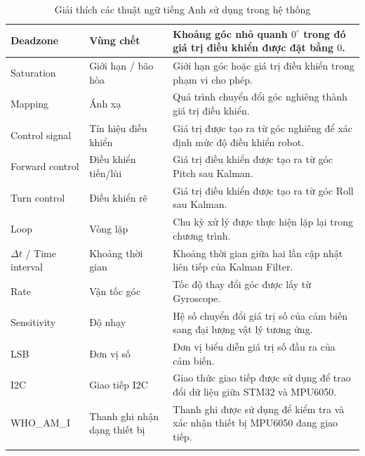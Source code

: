 \documentclass[a4paper,12pt]{report}
\begin{document}
\begin{longtable}{|p{3.5cm}|p{3.5cm}|p{7cm}|}
    Deadzone &
    Vùng chết &
    Khoảng góc nhỏ quanh $0^\circ$ trong đó giá trị điều khiển được đặt bằng $0$. \\
    \hline

    Saturation &
    Giới hạn / bão hòa &
    Giới hạn góc hoặc giá trị điều khiển trong phạm vi cho phép. \\
    \hline

    Mapping &
    Ánh xạ &
    Quá trình chuyển đổi góc nghiêng thành giá trị điều khiển. \\
    \hline

    Control signal &
    Tín hiệu điều khiển &
    Giá trị được tạo ra từ góc nghiêng để xác định mức độ điều khiển robot. \\
    \hline

    Forward control &
    Điều khiển tiến/lùi &
    Giá trị điều khiển được tạo ra từ góc Pitch sau Kalman. \\
    \hline

    Turn control &
    Điều khiển rẽ &
    Giá trị điều khiển được tạo ra từ góc Roll sau Kalman. \\
    \hline

    Loop &
    Vòng lặp &
    Chu kỳ xử lý được thực hiện lặp lại trong chương trình. \\
    \hline

    $\Delta t$ / Time interval &
    Khoảng thời gian &
    Khoảng thời gian giữa hai lần cập nhật liên tiếp của Kalman Filter. \\
    \hline

    Rate &
    Vận tốc góc &
    Tốc độ thay đổi góc được lấy từ Gyroscope. \\
    \hline

    Sensitivity &
    Độ nhạy &
    Hệ số chuyển đổi giá trị số của cảm biến sang đại lượng vật lý tương ứng. \\
    \hline

    LSB &
    Đơn vị số &
    Đơn vị biểu diễn giá trị số đầu ra của cảm biến. \\
    \hline

    I2C &
    Giao tiếp I2C &
    Giao thức giao tiếp được sử dụng để trao đổi dữ liệu giữa STM32 và MPU6050. \\
    \hline

    WHO\_AM\_I &
    Thanh ghi nhận dạng thiết bị &
    Thanh ghi được sử dụng để kiểm tra và xác nhận thiết bị MPU6050 đang giao tiếp. \\
    \hline
    \caption{Giải thích các thuật ngữ tiếng Anh sử dụng trong hệ thống}
    \label{tab:english-vietnamese}
\end{longtable}
\end{document}
